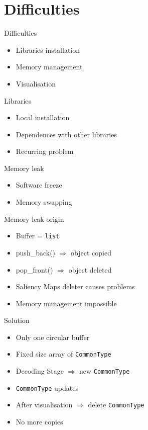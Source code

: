 \documentclass[t,14pt]{beamer}
\begin{document}
\section[Difficulties]{Difficulties}
	\begin{frame}{Difficulties}
		\vspace*{5mm}
	\begin{itemize}
	\item Libraries installation
	\item Memory management
	\item Visualisation
	\end{itemize}
	\end{frame}

	\begin{frame}{Libraries}
	\vspace*{5mm}
	\begin{itemize}[<+->]
		\item Local installation
		\item Dependences with other libraries
		\item Recurring problem
	\end{itemize}	
	\end{frame}
	
	\begin{frame}{Memory leak}
	\vspace*{5mm}
	\begin{itemize}[<+->]
		\item Software freeze
		\item Memory swapping
	\end{itemize}
	\end{frame}
	
	\begin{frame}{Memory leak origin}
	\vspace*{5mm}
	\begin{itemize}[<+->]
		\item Buffer = \texttt{list}
		\item push\_back() $\Rightarrow$ object copied
		\item pop\_front() $\Rightarrow$ object deleted
		\item Saliency Maps deleter causes problems 
		\item Memory management impossible
	\end{itemize}
	\end{frame}
	
	\begin{frame}{Solution}
	\vspace*{5mm}
	\begin{itemize}[<+->]
		\item Only one circular buffer
		\item Fixed size array of \texttt{CommonType}
		\item Decoding Stage $\Rightarrow$ new \texttt{CommonType}
		\item \texttt{CommonType} updates
		\item After visualisation $\Rightarrow$ delete \texttt{CommonType} 
		\item No more copies
	\end{itemize}
	\end{frame}
	
\end{document}
